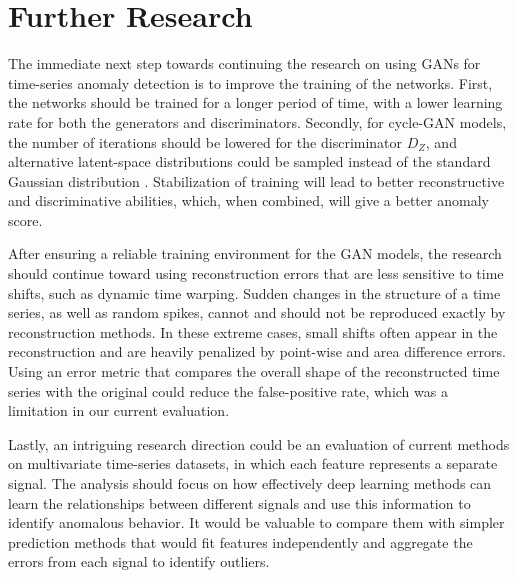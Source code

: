 \section*{Further Research}
\label{sec:06-further-research}
The immediate next step towards continuing the research on using GANs for time-series anomaly detection is to improve the training of the networks. First, the networks should be trained for a longer period of time, with a lower learning rate for both the generators and discriminators. Secondly, for cycle-GAN models, the number of iterations should be lowered for the discriminator $D_Z$, and alternative latent-space distributions could be sampled instead of the standard Gaussian distribution \cite{white2016sampling_gans}. Stabilization of training will lead to better reconstructive and discriminative abilities, which, when combined, will give a better anomaly score.

After ensuring a reliable training environment for the GAN models, the research should continue toward using reconstruction errors that are less sensitive to time shifts, such as dynamic time warping. Sudden changes in the structure of a time series, as well as random spikes, cannot and should not be reproduced exactly by reconstruction methods. In these extreme cases, small shifts often appear in the reconstruction and are heavily penalized by point-wise and area difference errors. Using an error metric that compares the overall shape of the reconstructed time series with the original could reduce the false-positive rate, which was a limitation in our current evaluation.

Lastly, an intriguing research direction could be an evaluation of current methods on multivariate time-series datasets, in which each feature represents a separate signal. The analysis should focus on how effectively deep learning methods can learn the relationships between different signals and use this information to identify anomalous behavior. It would be valuable to compare them with simpler prediction methods that would fit features independently and aggregate the errors from each signal to identify outliers. 

